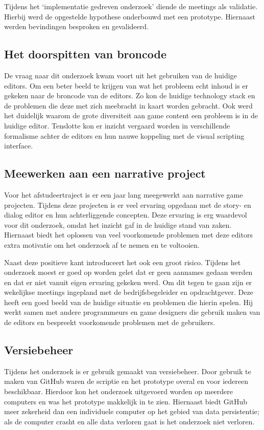 Tijdens het ‘implementatie gedreven onderzoek’ diende de meetings als validatie. Hierbij werd de opgestelde hypothese onderbouwd met een prototype. Hiernaast werden bevindingen besproken en gevalideerd.

\subsection{Het doorspitten van broncode}
De vraag naar dit onderzoek kwam voort uit het gebruiken van de huidige editors. Om een beter beeld te krijgen van wat het probleem echt inhoud is er gekeken naar de broncode van de editors. Zo kon de huidige technology stack en de problemen die deze met zich meebracht in kaart worden gebracht. Ook werd het duidelijk waarom de grote diversiteit aan game content een probleem is in de huidige editor. Tenslotte kon er inzicht vergaard worden in verschillende formalisme achter de editors en hun nauwe koppeling met de visual scripting interface.

\subsection{Meewerken aan een narrative project}
Voor het afstudeertraject is er een jaar lang meegewerkt aan narrative game projecten. Tijdens deze projecten is er veel ervaring opgedaan met de story- en dialog editor en hun achterliggende concepten. Deze ervaring is erg waardevol voor dit onderzoek, omdat het inzicht gaf in de huidige stand van zaken. Hiernaast biedt het oplossen van veel voorkomende problemen met deze editors extra motivatie om het onderzoek af te nemen en te voltooien.

Naast deze positieve kant introduceert het ook een groot risico. Tijdens het onderzoek moest er goed op worden gelet dat er geen aannames gedaan werden en dat er niet vanuit eigen ervaring gekeken werd. Om dit tegen te gaan zijn er wekelijkse meetings ingepland met de bedrijfsbegeleider en opdrachtgever. Deze heeft een goed beeld van de huidige situatie en problemen die hierin spelen. Hij werkt samen met andere programmeurs en game designers die gebruik maken van de editors en bespreekt voorkomende problemen met de gebruikers.

\subsection{Versiebeheer}
Tijdens het onderzoek is er gebruik gemaakt van versiebeheer. Door gebruik te maken van GitHub waren de scriptie en het prototype overal en voor iedereen beschikbaar. Hierdoor kon het onderzoek uitgevoerd worden op meerdere computers en was het prototype makkelijk in te zien. Hiernaast biedt GitHub meer zekerheid dan een individuele computer op het gebied van data persistentie; als de computer crasht en alle data verloren gaat is het onderzoek niet verloren.

